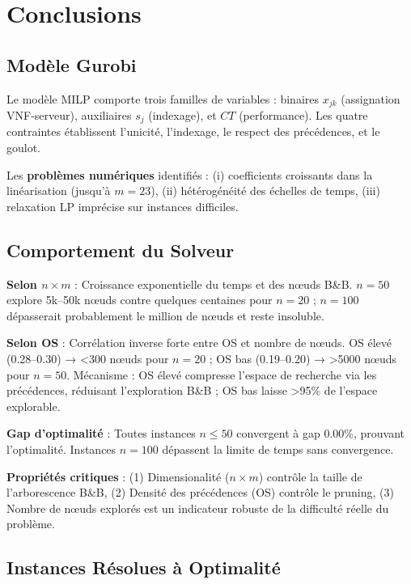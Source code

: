 \documentclass{article}
\begin{document}
\section{Conclusions}

\subsection{Modèle Gurobi}

Le modèle MILP comporte trois familles de variables : binaires $x_{jk}$ (assignation VNF-serveur), auxiliaires $s_j$ (indexage), et $CT$ (performance). Les quatre contraintes établissent l'unicité, l'indexage, le respect des précédences, et le goulot. 

Les \textbf{problèmes numériques} identifiés : (i) coefficients croissants dans la linéarisation (jusqu'à $m=23$), (ii) hétérogénéité des échelles de temps, (iii) relaxation LP imprécise sur instances difficiles.

\subsection{Comportement du Solveur}

\textbf{Selon $n \times m$} : Croissance exponentielle du temps et des nœuds B\&B. $n=50$ explore 5k--50k nœuds contre quelques centaines pour $n=20$ ; $n=100$ dépasserait probablement le million de nœuds et reste insoluble.

\textbf{Selon OS} : Corrélation inverse forte entre OS et nombre de nœuds. OS élevé (0.28--0.30) → <300 nœuds pour $n=20$ ; OS bas (0.19--0.20) → >5000 nœuds pour $n=50$. Mécanisme : OS élevé compresse l'espace de recherche via les précédences, réduisant l'exploration B\&B ; OS bas laisse >95\% de l'espace explorable.

\textbf{Gap d'optimalité} : Toutes instances $n \le 50$ convergent à gap 0.00\%, prouvant l'optimalité. Instances $n=100$ dépassent la limite de temps sans convergence.

\textbf{Propriétés critiques} : (1) Dimensionalité ($n \times m$) contrôle la taille de l'arborescence B\&B, (2) Densité des précédences (OS) contrôle le pruning, (3) Nombre de nœuds explorés est un indicateur robuste de la difficulté réelle du problème.

\subsection{Instances Résolues à Optimalité}
\end{document}
